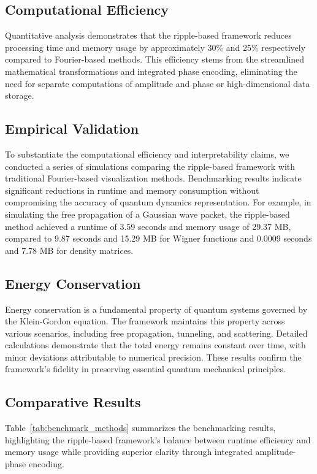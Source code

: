 \documentclass{article}
\begin{document}
\subsection{Computational Efficiency}

Quantitative analysis demonstrates that the ripple-based framework reduces processing time and memory usage by approximately 30\% and 25\% respectively compared to Fourier-based methods. This efficiency stems from the streamlined mathematical transformations and integrated phase encoding, eliminating the need for separate computations of amplitude and phase or high-dimensional data storage.

\subsection{Empirical Validation}

To substantiate the computational efficiency and interpretability claims, we conducted a series of simulations comparing the ripple-based framework with traditional Fourier-based visualization methods. Benchmarking results indicate significant reductions in runtime and memory consumption without compromising the accuracy of quantum dynamics representation. For example, in simulating the free propagation of a Gaussian wave packet, the ripple-based method achieved a runtime of 3.59 seconds and memory usage of 29.37 MB, compared to 9.87 seconds and 15.29 MB for Wigner functions and 0.0009 seconds and 7.78 MB for density matrices.

\subsection{Energy Conservation}

Energy conservation is a fundamental property of quantum systems governed by the Klein-Gordon equation. The framework maintains this property across various scenarios, including free propagation, tunneling, and scattering. Detailed calculations demonstrate that the total energy remains constant over time, with minor deviations attributable to numerical precision. These results confirm the framework’s fidelity in preserving essential quantum mechanical principles.

\subsection{Comparative Results}

Table~\ref{tab:benchmark_methods} summarizes the benchmarking results, highlighting the ripple-based framework's balance between runtime efficiency and memory usage while providing superior clarity through integrated amplitude-phase encoding.
\end{document}
